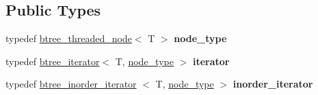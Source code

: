 \subsection*{\-Public \-Types}
\begin{DoxyCompactItemize}
\item 
\hypertarget{classtree_1_1cThreadedRep_aa2df7e02a980552a4a16e4c669049654}{typedef \hyperlink{structtree_1_1btree__threaded__node}{btree\-\_\-threaded\-\_\-node}$<$ \-T $>$ {\bfseries node\-\_\-type}}\label{classtree_1_1cThreadedRep_aa2df7e02a980552a4a16e4c669049654}

\item 
\hypertarget{classtree_1_1cThreadedRep_ac9f5a3607794b24b7cda7d2288ce2cc8}{typedef \hyperlink{classtree_1_1btree__iterator}{btree\-\_\-iterator}$<$ \-T, \*
\hyperlink{structtree_1_1btree__threaded__node}{node\-\_\-type} $>$ {\bfseries iterator}}\label{classtree_1_1cThreadedRep_ac9f5a3607794b24b7cda7d2288ce2cc8}

\item 
\hypertarget{classtree_1_1cThreadedRep_aec013eb2bc9a327239d1366f039ed94e}{typedef \hyperlink{classtree_1_1btree__inorder__iterator}{btree\-\_\-inorder\-\_\-iterator}\*
$<$ \-T, \hyperlink{structtree_1_1btree__threaded__node}{node\-\_\-type} $>$ {\bfseries inorder\-\_\-iterator}}\label{classtree_1_1cThreadedRep_aec013eb2bc9a327239d1366f039ed94e}

\end{DoxyCompactItemize}
